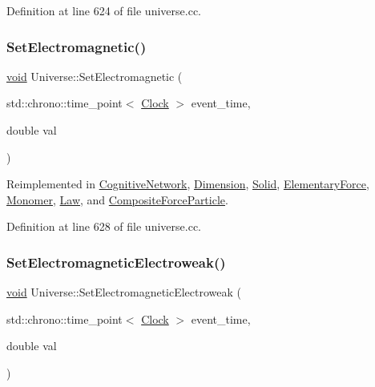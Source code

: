 Definition at line 624 of file universe.\+cc.

\mbox{\label{class_universe_aa981fc7e252b1fbbb675f0371860954d}} 
\subsubsection{\texorpdfstring{Set\+Electromagnetic()}{SetElectromagnetic()}}
{\footnotesize\ttfamily \mbox{\hyperlink{glad_8h_a950fc91edb4504f62f1c577bf4727c29}{void}} Universe\+::\+Set\+Electromagnetic (\begin{DoxyParamCaption}\item[{std\+::chrono\+::time\+\_\+point$<$ \mbox{\hyperlink{universe_8h_a0ef8d951d1ca5ab3cfaf7ab4c7a6fd80}{Clock}} $>$}]{event\+\_\+time,  }\item[{double}]{val }\end{DoxyParamCaption})\hspace{0.3cm}{\ttfamily [virtual]}}



Reimplemented in \mbox{\hyperlink{class_cognitive_network_a31764cd5746369d16b45f2ff74806a0b}{Cognitive\+Network}}, \mbox{\hyperlink{class_dimension_ad8c18ce6358904e01594092dca9f1311}{Dimension}}, \mbox{\hyperlink{class_solid_a9a660f9d94f597712c67922aa1d4d795}{Solid}}, \mbox{\hyperlink{class_elementary_force_a67f6845bd715c29c17387d291b343a1b}{Elementary\+Force}}, \mbox{\hyperlink{class_monomer_a50e41be601b31450a97bfd15950cfb3d}{Monomer}}, \mbox{\hyperlink{class_law_acabe1a3113c207368f3bb6fe81e13963}{Law}}, and \mbox{\hyperlink{class_composite_force_particle_a476c0d570c3be75c9e186df1ec2a5cda}{Composite\+Force\+Particle}}.



Definition at line 628 of file universe.\+cc.

\mbox{\label{class_universe_a608aa95698380f791a0ffba45cc1bee3}} 
\subsubsection{\texorpdfstring{Set\+Electromagnetic\+Electroweak()}{SetElectromagneticElectroweak()}}
{\footnotesize\ttfamily \mbox{\hyperlink{glad_8h_a950fc91edb4504f62f1c577bf4727c29}{void}} Universe\+::\+Set\+Electromagnetic\+Electroweak (\begin{DoxyParamCaption}\item[{std\+::chrono\+::time\+\_\+point$<$ \mbox{\hyperlink{universe_8h_a0ef8d951d1ca5ab3cfaf7ab4c7a6fd80}{Clock}} $>$}]{event\+\_\+time,  }\item[{double}]{val }\end{DoxyParamCaption})\hspace{0.3cm}{\ttfamily [virtual]}}



